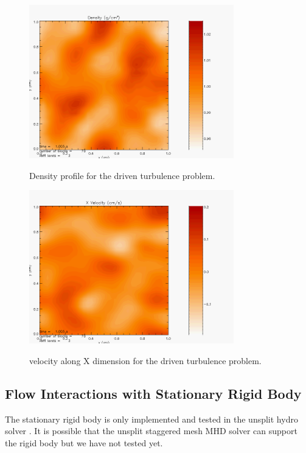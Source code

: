 \begin{figure}
\begin{center}
{\leavevmode\includegraphics[width=3.5in]{StirTurb_dens}}
\end{center}
\caption{\label{Fig:stirturb_dens} Density profile for the 
driven turbulence problem. }
\end{figure}

\begin{figure}
\begin{center}
{\leavevmode\includegraphics[width=3.5in]{StirTurb_velx}}
\end{center}
\caption{\label{Fig:stirturb_velx} velocity along X dimension for the 
driven turbulence problem. }
\end{figure}



\newpage
\subsection{Flow Interactions with Stationary Rigid Body}
The stationary rigid body is only implemented and tested in the unsplit hydro solver . 
It is possible that the unsplit staggered mesh MHD solver  can support the rigid body but we have not
tested yet.

